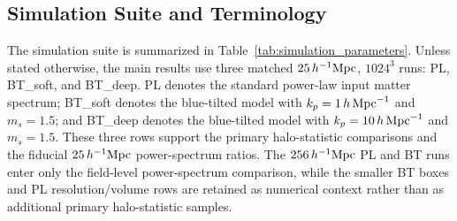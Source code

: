 \documentclass[
 reprint,
 superscriptaddress,
 nofootinbib,
 nobibnotes,
 amsmath,
 amssymb,
 aps,
 prd,
 floatfix,
 longbibliography
]{revtex4-2}
\begin{document}
\subsection{Simulation Suite and Terminology\label{subsec:Terminology}}

The simulation suite is summarized in Table~\ref{tab:simulation_parameters}. Unless stated otherwise, the main results use three matched $25\,h^{-1}{\rm Mpc}$, $1024^3$ runs: PL, BT\_soft, and BT\_deep. PL denotes the standard power-law input matter spectrum; BT\_soft denotes the blue-tilted model with $k_p=1\,h\,{\rm Mpc}^{-1}$ and $m_s=1.5$; and BT\_deep denotes the blue-tilted model with $k_p=10\,h\,{\rm Mpc}^{-1}$ and $m_s=1.5$. These three rows support the primary halo-statistic comparisons and the fiducial \(25\,h^{-1}{\rm Mpc}\) power-spectrum ratios. The \(256\,h^{-1}{\rm Mpc}\) PL and BT runs enter only the field-level power-spectrum comparison, while the smaller BT boxes and PL resolution/volume rows are retained as numerical context rather than as additional primary halo-statistic samples.
\end{document}
